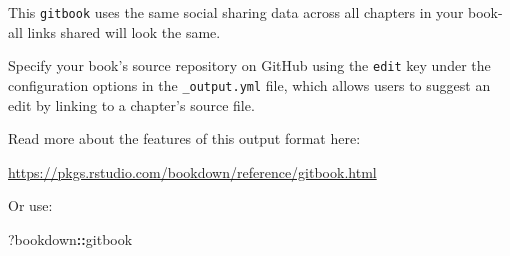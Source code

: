 \documentclass[
]{book}
\newenvironment{Shaded}{\begin{snugshade}}{\end{snugshade}}
\newcommand{\NormalTok}[1]{#1}
\newcommand{\SpecialCharTok}[1]{\textcolor[rgb]{0.81,0.36,0.00}{\textbf{#1}}}
\begin{document}
This \texttt{gitbook} uses the same social sharing data across all chapters in your book- all links shared will look the same.

Specify your book's source repository on GitHub using the \texttt{edit} key under the configuration options in the \texttt{\_output.yml} file, which allows users to suggest an edit by linking to a chapter's source file.

Read more about the features of this output format here:

\url{https://pkgs.rstudio.com/bookdown/reference/gitbook.html}

Or use:

\begin{Shaded}
\begin{Highlighting}[]
\NormalTok{?bookdown}\SpecialCharTok{::}\NormalTok{gitbook}
\end{Highlighting}
\end{Shaded}


  
\end{document}
